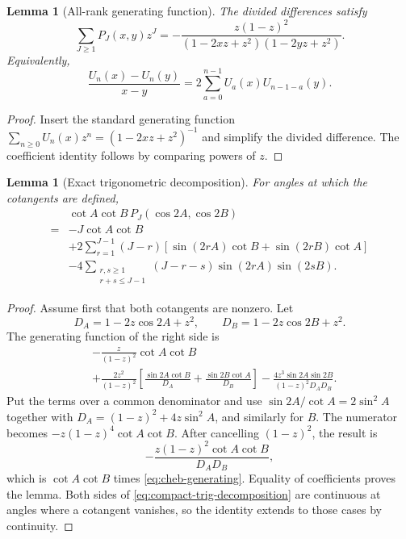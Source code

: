 \documentclass[11pt]{article}
\newtheorem{lemma}[theorem]{Lemma}
\theoremstyle{definition}
\begin{document}
\begin{lemma}[All-rank generating function]
\label{lem:chebyshev}
The divided differences satisfy
\begin{equation}
 \sum_{J\geq1}P_J(x,y)z^J
 =-\frac{z(1-z)^2}
 {(1-2xz+z^2)(1-2yz+z^2)}.
 \label{eq:cheb-generating}
\end{equation}
Equivalently,
\[
 \frac{U_n(x)-U_n(y)}{x-y}
 =2\sum_{a=0}^{n-1}U_a(x)U_{n-1-a}(y).
\]
\end{lemma}

\begin{proof}
Insert the standard generating function
$\sum_{n\geq0}U_n(x)z^n=(1-2xz+z^2)^{-1}$ and simplify the divided
difference.  The coefficient identity follows by comparing powers of $z$.
\end{proof}

\begin{lemma}[Exact trigonometric decomposition]
\label{lem:compact-trig}
For angles at which the cotangents are defined,
\begin{align}
&\cot A\cot B\,P_J(\cos2A,\cos2B)\nonumber\\
={}&-J\cot A\cot B\nonumber\\
&+2\sum_{r=1}^{J-1}(J-r)
\left[\sin(2rA)\cot B+\sin(2rB)\cot A\right]\nonumber\\
&-4\!\!\sum_{\substack{r,s\geq1\\r+s\leq J-1}}
(J-r-s)\sin(2rA)\sin(2sB).
\label{eq:compact-trig-decomposition}
\end{align}
\end{lemma}

\begin{proof}
Assume first that both cotangents are nonzero.  Let
\[
 D_A=1-2z\cos2A+z^2,\qquad
 D_B=1-2z\cos2B+z^2.
\]
The generating function of the right side is
\begin{align*}
 &-\frac{z}{(1-z)^2}\cot A\cot B\\
 &+\frac{2z^2}{(1-z)^2}
 \left[\frac{\sin2A\cot B}{D_A}
      +\frac{\sin2B\cot A}{D_B}\right]
 -\frac{4z^3\sin2A\sin2B}{(1-z)^2D_AD_B}.
\end{align*}
Put the terms over a common denominator and use
$\sin2A/\cot A=2\sin^2A$ together with
$D_A=(1-z)^2+4z\sin^2A$, and similarly for $B$.  The numerator becomes
$-z(1-z)^4\cot A\cot B$.  After cancelling $(1-z)^2$, the result is
\[
 -\frac{z(1-z)^2\cot A\cot B}{D_AD_B},
\]
which is $\cot A\cot B$ times
\eqref{eq:cheb-generating}.  Equality of coefficients proves the lemma.
Both sides of \eqref{eq:compact-trig-decomposition} are continuous at angles
where a cotangent vanishes, so the identity extends to those cases by
continuity.
\end{proof}
\end{document}
